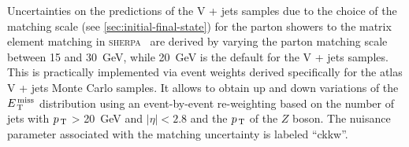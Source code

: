 Uncertainties on the predictions of the V + jets samples due to the choice of
the matching scale (see \cref{sec:initial-final-state}) for the parton showers
to the matrix element matching in \textsc{sherpa}~\cite{SHERPAGenerator} are
derived by varying the parton matching scale between 15 and 30~GeV, while 20~GeV
is the default for the V + jets samples. This is practically implemented via
event weights derived specifically for the \gls{atlas} V + jets Monte Carlo
samples. It allows to obtain up and down variations of the $E_\mathrm{\, T}^\mathrm{\, miss}$ distribution
using an event-by-event re-weighting based on the number of jets with $p_\mathrm{\, T}$ >
20~GeV and $|\eta| < 2.8$ and the $p_\mathrm{\, T}$ of the $Z$ boson. The nuisance parameter
associated with the matching uncertainty is labeled ``ckkw''.
